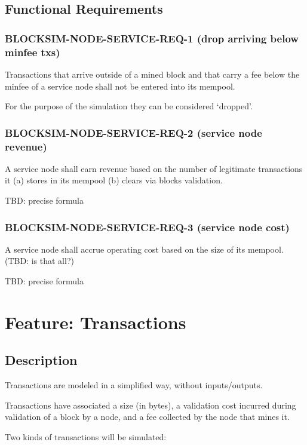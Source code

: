\documentclass{scrreprt}
\begin{document}
\subsection{Functional Requirements}

\subsubsection{BLOCKSIM-NODE-SERVICE-REQ-1 (drop arriving below minfee txs)}

Transactions that arrive outside of a mined block and that carry a fee below
the minfee of a service node shall not be entered into its mempool.

For the purpose of the simulation they can be considered `dropped'.


\subsubsection{BLOCKSIM-NODE-SERVICE-REQ-2 (service node revenue)}

A service node shall earn revenue based on the number of legitimate
transactions it (a) stores in its mempool  (b) clears via blocks validation.

TBD: precise formula

\subsubsection{BLOCKSIM-NODE-SERVICE-REQ-3 (service node cost)}

A service node shall accrue operating cost based on the size of its
mempool. (TBD: is that all?)

TBD: precise formula


\section{Feature: Transactions}

\subsection{Description}

Transactions are modeled in a simplified way, without inputs/outputs.

Transactions have associated a size (in bytes), a validation cost incurred
during validation of a block by a node, and a fee collected by the node that
mines it.

Two kinds of transactions will be simulated:
\end{document}
